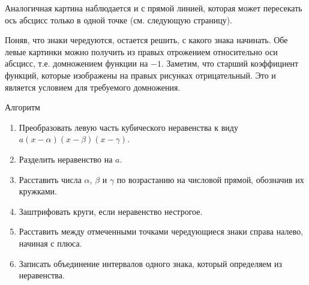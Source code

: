 \documentclass[algebra,twocolumn]{pum}
\begin{document}
Аналогичная картина наблюдается и с прямой линией, которая может пересекать ось абсцисс только в одной точке (см. следующую страницу).
\begin{figure}[h]
  \centering
\end{figure}

Поняв, что знаки чередуются, остается решить, с какого знака начинать. Обе левые картинки можно получить из правых отрожением относительно оси абсцисс, т.е. домножением функции на $-1$. Заметим, что старший коэффициент функций, которые изображены на правых рисунках отрицательный. Это и является условием для требуемого домножения.

\begin{pumbox}{Алгоритм}
  \begin{enumerate}[label=\arabic*.]
    \item Преобразовать левую часть кубического неравенства к виду $a(x-\alpha)(x-\beta)(x-\gamma)$.
    \item Разделить неравенство на $a$.
    \item Расставить числа $\alpha$, $\beta$ и $\gamma$ по возрастанию на числовой прямой, обозначив их кружками.
    \item Заштрифовать круги, если неравенство нестрогое.
    \item Расставить между отмеченными точками чередующиеся знаки справа налево, начиная с плюса.
    \item Записать объединение интервалов одного знака, который определяем из неравенства.
  \end{enumerate}
\end{pumbox}
\end{document}
